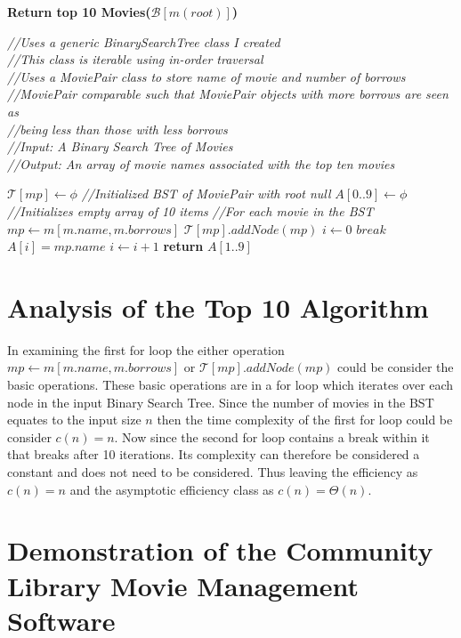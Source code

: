\documentclass[a4paper,12pt]{article}
\begin{document}
\begin{algorithm}
\caption{\textbf{Return top 10 Movies($ \mathcal B[m(root)]$)}}
\emph{//Uses a generic BinarySearchTree class I created}\\
\emph{//This class is iterable using in-order traversal}\\
\emph{//Uses a MoviePair class to store name of movie and number of borrows}\\
\emph{//MoviePair comparable such that MoviePair objects with more borrows are seen as}\\
\emph{//being less than those with less borrows}\\
\emph{//Input: A Binary Search Tree of Movies}\\
\emph{//Output: An array of movie names associated with the top ten movies}
\begin{algorithmic}[1]
\State $\mathcal T[mp] \leftarrow \phi$ \emph{//Initialized BST of MoviePair with root null}
\State $A[0..9] \leftarrow \phi$ \emph{//Initializes empty array of 10 items}
 \emph{//For each movie in the BST}
	\State $mp \leftarrow m[m.name, m.borrows]$ 
	\State $ \mathcal T[mp].addNode(mp)$
\EndFor
\State $i \leftarrow 0$
		\State $break$
	\EndIf
	\State $A[i] = mp.name$
	\State $i \leftarrow i + 1$
\EndFor
\State \textbf{return} $A[1..9]$
\end{algorithmic}
\end{algorithm}
\section{Analysis of the Top 10 Algorithm}
In examining the first for loop the either operation $mp \leftarrow m[m.name, m.borrows]$ or $ \mathcal T[mp].addNode(mp)$ could be consider the basic operations. These basic operations are in a for loop which iterates over each node in the input Binary Search Tree. Since the number of movies in the BST equates to the input size $n$ then the time complexity of the first for loop could be consider $c(n) = n$. Now since the second for loop contains a break within it that breaks after 10 iterations. Its complexity can therefore be considered a constant and does not need to be considered. Thus leaving the efficiency as $c(n) = n$ and the asymptotic efficiency class as $c(n) = \Theta(n)$.

\newpage

\section{Demonstration of the Community Library Movie Management Software}
\end{document}
